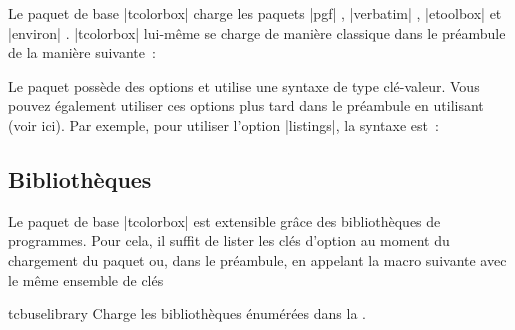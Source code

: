 {Le paquet de base |tcolorbox| charge les paquets |pgf| \cite{tantau:tikz_and_pgf},
|verbatim| \cite{schoepf:2001a}, |etoolbox| \cite{lehmann:etoolbox} et |environ|
\cite{robertson:2014a}.
|tcolorbox| lui-même se charge de manière classique dans le préambule de la manière suivante~:
\begin{dispListing}
\usepackage{tcolorbox}
\end{dispListing}
Le paquet possède des options et utilise une syntaxe de type clé-valeur.
Vous pouvez également utiliser ces options plus tard dans le préambule en utilisant
 (voir ici).
Par exemple, pour utiliser l'option |listings|, la syntaxe est~:
\begin{dispListing}
\usepackage[listings]{tcolorbox}
\end{dispListing}



\clearpage
\subsection{Bibliothèques}\label{sec:bibliothek}


Le paquet de base |tcolorbox| est extensible grâce des bibliothèques de programmes.
Pour cela, il suffit de lister les clés d'option au moment du chargement du paquet
ou, dans le préambule, en appelant la macro suivante avec le même ensemble de clés

\begin{docCommand}{tcbuselibrary}{}
  Charge les bibliothèques énumérées dans la .
\begin{dispListing}
\end{dispListing}
\end{docCommand}



}
